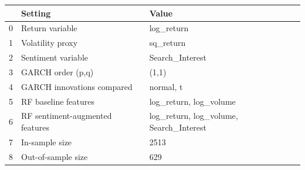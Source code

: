 \begin{table}[htbp]
\centering
\begin{tabular}{lll}
\toprule
 & Setting & Value \\
\midrule
0 & Return variable & log_return \\
1 & Volatility proxy & sq_return \\
2 & Sentiment variable & Search_Interest \\
3 & GARCH order (p,q) & (1,1) \\
4 & GARCH innovations compared & normal, t \\
5 & RF baseline features & log_return, log_volume \\
6 & RF sentiment-augmented features & log_return, log_volume, Search_Interest \\
7 & In-sample size & 2513 \\
8 & Out-of-sample size & 629 \\
\bottomrule
\end{tabular}
\label{tab:model_spec}
\end{table}
